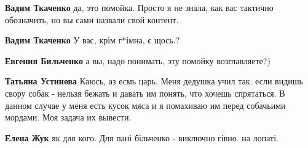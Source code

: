 \begin{itemize}
\begin{itemize}
 
\textbf{Вадим Ткаченко} да, это помойка. Просто я не знала, как вас тактично обозначить, но вы сами назвали свой контент.

 
\textbf{Вадим Ткаченко} У вас, крім г*імна, є щось.?

 
\textbf{Евгения Бильченко} а вы, надо понимать, эту помойку возглавляете?)

 
\textbf{Татьяна Устинова} Каюсь, аз есмь царь. Меня дедушка учил так: если видишь свору собак - нельзя бежать и давать им понять, что хочешь спрятаться. В данном случае у меня есть кусок мяса и я помахиваю им перед собачьими мордами. Моя задача их вывести.

 
\textbf{Елена Жук} як для кого. Для пані більченко - виключно гівно. на лопаті.
\end{itemize}

 


\end{itemize}
